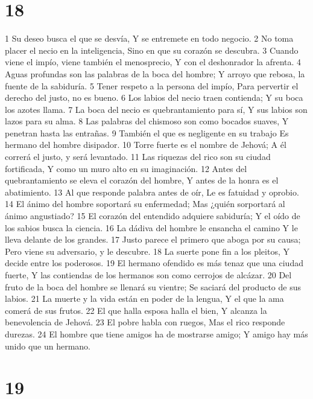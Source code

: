 \chapter{18}

1 Su deseo busca el que se desvía,
Y se entremete en todo negocio.
2 No toma placer el necio en la inteligencia,
Sino en que su corazón se descubra.
3 Cuando viene el impío, viene también el menosprecio,
Y con el deshonrador la afrenta.
4 Aguas profundas son las palabras de la boca del hombre;
Y arroyo que rebosa, la fuente de la sabiduría.
5 Tener respeto a la persona del impío,
Para pervertir el derecho del justo, no es bueno.
6 Los labios del necio traen contienda; 
Y su boca los azotes llama.
7 La boca del necio es quebrantamiento para sí,
Y sus labios son lazos para su alma.
8 Las palabras del chismoso son como bocados suaves,
Y penetran hasta las entrañas.
9 También el que es negligente en su trabajo
Es hermano del hombre disipador.
10 Torre fuerte es el nombre de Jehová;
A él correrá el justo, y será levantado.
11 Las riquezas del rico son su ciudad fortificada,
Y como un muro alto en su imaginación.
12 Antes del quebrantamiento se eleva el corazón del hombre,
Y antes de la honra es el abatimiento.
13 Al que responde palabra antes de oír,
Le es fatuidad y oprobio.
14 El ánimo del hombre soportará su enfermedad;
Mas ¿quién sorportará al ánimo angustiado?
15 El corazón del entendido adquiere sabiduría;
Y el oído de los sabios busca la ciencia.
16 La dádiva del hombre le ensancha el camino
Y le lleva delante de los grandes.
17 Justo parece el primero que aboga por su causa;
Pero viene su adversario, y le descubre.
18 La suerte pone fin a los pleitos,
Y decide entre los poderosos.
19 El hermano ofendido es más tenaz que una ciudad fuerte,
Y las contiendas de los hermanos son como cerrojos de alcázar.
20 Del fruto de la boca del hombre se llenará su vientre;
Se saciará del producto de sus labios.
21 La muerte y la vida están en poder de la lengua,
Y el que la ama comerá de sus frutos.
22 El que halla esposa halla el bien,
Y alcanza la benevolencia de Jehová.
23 El pobre habla con ruegos,
Mas el rico responde durezas.
24 El hombre que tiene amigos ha de mostrarse amigo;
Y amigo hay más unido que un hermano.

\chapter{19}

